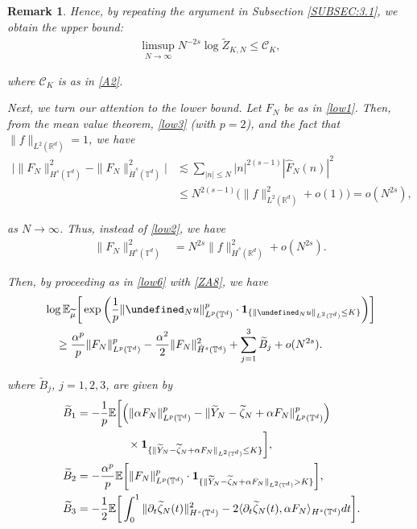 \documentclass[letterpaper, 11pt,  reqno]{amsart}
\newtheorem{remark}[theorem]{Remark}
\newcommand{\noi}{\noindent}
\newcommand{\R}{\mathbb{R}}
\newcommand{\T}{\mathbb{T}}
\let\P= \undefined
\newcommand{\P}{\mathbf{P}}
\newcommand{\E}{\mathbb{E}}
\newcommand{\ft}{\widehat}
\newcommand{\wt}{\widetilde}
\newcommand{\dt}{\partial_t}
\newcommand{\les}{\lesssim}
\newcommand{\jb}[1]
{\langle #1 \rangle}
\newcommand{\ind}{\mathbf 1}
\numberwithin{equation}{section}
\numberwithin{theorem}{section}
\newcommand{\ze}{\zeta}
\newcommand{\CC}{\mathcal{C}}
\begin{document}
\begin{remark}
\noi
Hence, 
 by repeating the argument in Subsection \ref{SUBSEC:3.1}, 
we obtain the upper bound:
\begin{align}
\limsup_{N\to \infty}N^{-2s} \log \wt Z_{K, N}\le \CC_K, 
\label{ZA7}
\end{align}

\noi
where $\CC_K$ is as in \eqref{A2}.






Next, we turn our attention to the lower bound.
Let $F_N$ be as in 
\eqref{low1}.
Then, 
from the mean value theorem, 
\eqref{low3} (with $p = 2$), 
and the fact that $\| f\|_{L^2(\R^d)} = 1$, 
we have
\begin{align*}
\Big|\|F_N\|^2_{ H^{s}(\T^d)}
- \|F_N\|^2_{ \dot H^{s}(\T^d)}\Big|
& \les \sum_{|n|\le N} |n|^{2(s-1)}|\ft F _N(n)|^2\\
& \le  N^{2(s-1)} \Big(\| f \|^2_{L^2 (\R^d)}+o(1)\Big)
= o(N^{2s}), 
\end{align*}


\noi
as $N \to \infty$.
Thus, instead of \eqref{low2}, we have 
\begin{align}
\| F_N  \|^2_{H^s (\mathbb{T}^d)}
&=  N^{2s} \| f \|^2_{\dot H^{s} (\R^d)} + o(N^{2s}).
\label{ZA8}
\end{align}


\noi
Then, by proceeding as in 
\eqref{low6} with \eqref{ZA8}, we have 
\begin{align*}
& \log \E_{\wt \mu}\bigg[ 
\exp\bigg( \frac 1 p \| \P_N u\|^p_{L^p(\T^d)} \cdot 
 \ind_{\{ \| \P_{N} u \|_{L^2 (\mathbb{T}^d)}\leq K \}}\bigg)\bigg] \\
& \quad 
\ge \frac{\alpha^p}{p}\|F_N\|^p_{L^p(\T^d)}-\frac{\alpha^2}{2}\|F_N\|^2_{\dot H^{s}(\T^d)}
+\sum_{j = 1}^3 \wt B_j  + o(N^{2s}).
\end{align*}

\noi
where $\wt B_j$, $j = 1, 2, 3$, are 
 given by 
\begin{align*}
\wt  B_1& =-\frac{1}{p}
\E\bigg[\Big(\|\alpha F_N\|^p_{L^{p}(\T^d)}-\|\wt Y_N-\wt \ze_N+\alpha F_N\|^p_{L^p(\T^d)}\Big)\\
& \hphantom{XXXXX}
\times  \ind_{\{\|\wt Y_N-\wt \ze_N+\alpha F_N\|_{L^2(\T^d)}\le K\}}\bigg],\\
\wt B_2 & =-\frac{\alpha^p}{p}\E\bigg[\|F_N\|^p_{L^p(\T^d)}
\cdot \ind_{\{\|\wt Y_N-\wt \ze_N+\alpha F_N\|_{L^2(\T^d)}>K\}} \bigg],\\\
\wt B_3 & =-\frac{1}{2}\E\bigg[\int_{0}^1 
\|\dt \wt \ze_N(t)\| ^2_{ H^s(\T^d)}-2 
\jb{ \dt \wt \ze_N(t), \alpha F_N }_{H^{s}(\T^d)}dt\bigg].
\end{align*}



\end{remark}
\end{document}
